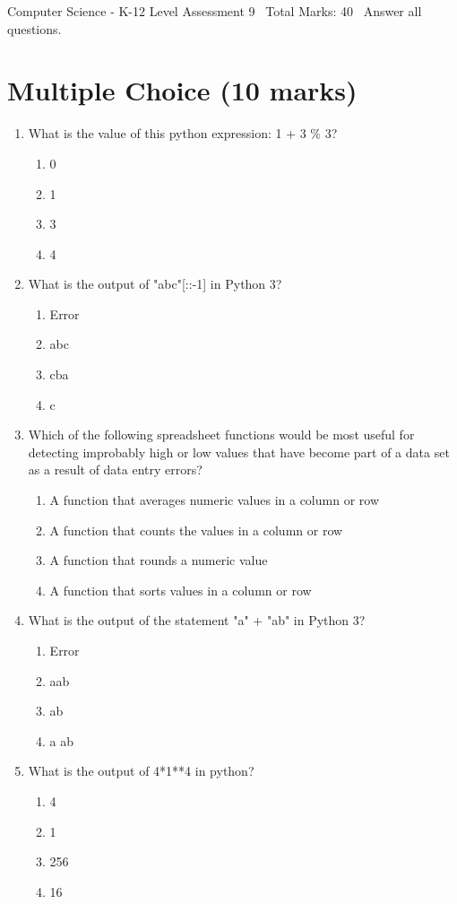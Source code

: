 \documentclass[12pt]{article}
\begin{document}
\begin{center}
Computer Science - K-12 Level Assessment 9 \
Total Marks: 40 \
Answer all questions.
\end{center}

\section*{Multiple Choice (10 marks)}
\begin{enumerate}[label=\arabic*.]
\item What is the value of this python expression: 1 + 3 \% 3?
\begin{enumerate}[label=(\alph*)]
    \item 0
    \item 1
    \item 3
    \item 4
\end{enumerate}
\item What is the output of "abc"[::-1] in Python 3?
\begin{enumerate}[label=(\alph*)]
    \item Error
    \item abc
    \item cba
    \item c
\end{enumerate}
\item Which of the following spreadsheet functions would be most useful for detecting improbably high or low values that have become part of a data set as a result of data entry errors?
\begin{enumerate}[label=(\alph*)]
    \item A function that averages numeric values in a column or row
    \item A function that counts the values in a column or row
    \item A function that rounds a numeric value
    \item A function that sorts values in a column or row
\end{enumerate}
\item What is the output of the statement "a" + "ab" in Python 3?
\begin{enumerate}[label=(\alph*)]
    \item Error
    \item aab
    \item ab
    \item a ab
\end{enumerate}
\item What is the output of 4*1**4 in python?
\begin{enumerate}[label=(\alph*)]
    \item 4
    \item 1
    \item 256
    \item 16
\end{enumerate}
\end{enumerate}
\end{document}
